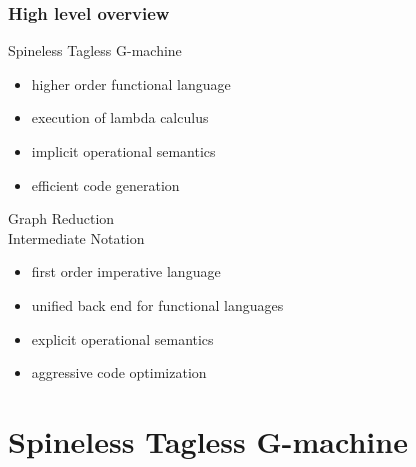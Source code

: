 \documentclass[bigger,aspectratio=169]{beamer}
\begin{document}
\begin{frame}[fragile]
\frametitle{High level overview}

\begin{minipage}{0.4\textwidth}
	\begin{center}
		Spineless Tagless G-machine
	\end{center}
	\begin{itemize}
		\item<2-> higher order functional language
		\item<3-> execution of lambda calculus
		\item<4-> implicit operational semantics
		\item<5-> efficient code generation
	\end{itemize}
\end{minipage}
\hfill
\begin{minipage}{0.4\textwidth}
	\begin{center}
		Graph Reduction \\Intermediate Notation
	\end{center}
	\begin{itemize}
		\item<6-> first order imperative language
		\item<7-> unified back end for functional languages
		\item<8-> explicit operational semantics
		\item<9-> aggressive code optimization 
	\end{itemize}
\end{minipage}

\end{frame}

\section{Spineless Tagless G-machine}
\end{document}
